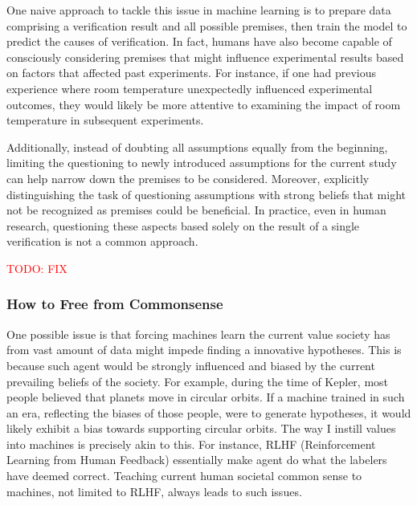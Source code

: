 \documentclass{article}
\begin{document}
One naive approach to tackle this issue in machine learning is to prepare data comprising a verification result and all possible premises, then train the model to predict the causes of verification. In fact, humans have also become capable of consciously considering premises that might influence experimental results based on factors that affected past experiments. For instance, if one had previous experience where room temperature unexpectedly influenced experimental outcomes, they would likely be more attentive to examining the impact of room temperature in subsequent experiments.

Additionally, instead of doubting all assumptions equally from the beginning, limiting the questioning to newly introduced assumptions for the current study can help narrow down the premises to be considered. Moreover, explicitly distinguishing the task of questioning assumptions with strong beliefs that might not be recognized as premises could be beneficial. In practice, even in human research, questioning these aspects based solely on the result of a single verification is not a common approach.

\textcolor{red}{TODO: FIX}

\subsubsection{How to Free from Commonsense}

One possible issue is that forcing machines learn the current value society has from vast amount of data might impede finding a innovative hypotheses. This is because such agent would be strongly influenced and biased by the current prevailing beliefs of the society. For example, during the time of Kepler, most people believed that planets move in circular orbits. If a machine trained in such an era, reflecting the biases of those people, were to generate hypotheses, it would likely exhibit a bias towards supporting circular orbits. The way I instill values into machines is precisely akin to this. For instance, RLHF (Reinforcement Learning from Human Feedback) essentially make agent do what the labelers have deemed correct. Teaching current human societal common sense to machines, not limited to RLHF, always leads to such issues.
 
\end{document}
